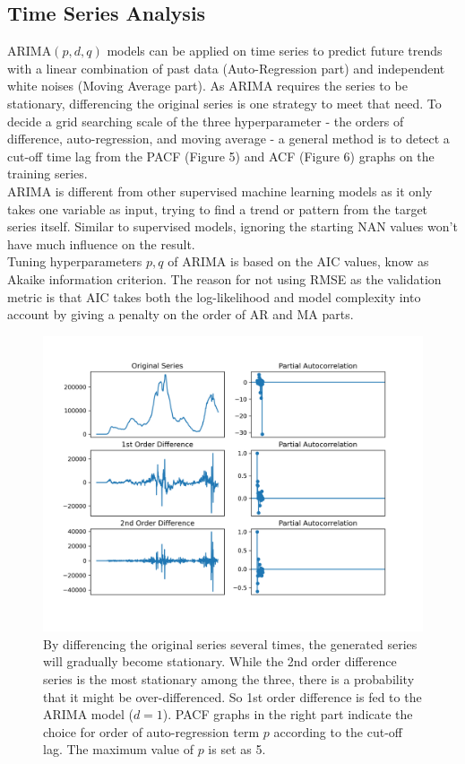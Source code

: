 \documentclass[11pt]{article}
\begin{document}
\subsection{Time Series Analysis}
ARIMA$(p,d,q)$ models can be applied on time series to predict future trends with a linear combination of past data (Auto-Regression part) and independent white noises (Moving Average part). As ARIMA requires the series to be stationary, differencing the original series is one strategy to meet that need. To decide a grid searching scale of the three hyperparameter -  the orders of difference, auto-regression, and moving average - a general method is to detect a cut-off time lag from the PACF (Figure 5) and ACF (Figure 6) graphs on the training series.\\

ARIMA is different from other supervised machine learning models as it only takes one variable as input, trying to find a trend or pattern from the target series itself. Similar to supervised models, ignoring the starting NAN values won't have much influence on the result. \\
 
Tuning hyperparameters $p,q$ of ARIMA is based on the AIC values, know as Akaike information criterion. The reason for not using RMSE as the validation metric is that AIC takes both the log-likelihood and model complexity into account by giving a penalty on the order of AR and MA parts. 
 \begin{figure}[htb]
 	\setlength{\abovecaptionskip}{0.cm}
 	\centering
 	\includegraphics[width=0.8\linewidth]{../figures/PACF.png} \vspace{-0.3in}
 	\caption{By differencing the original series several times, the generated series will gradually become stationary. While the 2nd order difference series is the most stationary among the three, there is a probability that it might be over-differenced. So 1st order difference is fed to the ARIMA model ($d=1$). PACF graphs in the right part indicate the choice for order of auto-regression term $p$ according to the cut-off lag. The maximum value of $p$ is set as 5.}
 \end{figure}
 
\end{document}
